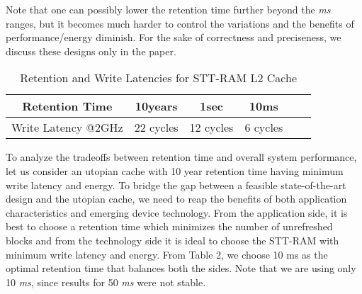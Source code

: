 Note that one can possibly lower the retention time further beyond the {\it ms} ranges, but it becomes much harder to control the variations and the benefits of performance/energy diminish. For the sake of correctness and preciseness,
we discuss these designs only in the paper.


\begin{table*}[t]
  \centering
  \caption{Retention and Write Latencies for STT-RAM L2 Cache}
  \label{table:rt-wt}
  \begin{tabular}{| c | c | c | c | c | c |}
  	\hline
	 Retention Time & 10years & 1sec &10ms \\
	\hline
	Write Latency @2GHz & 22 cycles & 12 cycles & 6 cycles \\
	\hline
  \end{tabular}
\end{table*}

To analyze the tradeoffs between retention time and overall system performance, let us consider an utopian cache
with 10 year retention time having minimum write latency and energy.  To bridge the gap between a
feasible state-of-the-art design and the utopian cache, we need to reap the benefits of both application
characteristics and emerging device technology. From the application side, it is best to choose a retention time
which minimizes the number of unrefreshed blocks and from the technology side it is ideal to choose the
STT-RAM with minimum write latency and energy. From Table 2, we choose 10 ms as the optimal retention time that
balances both the sides. Note that we are using only 10 {\it ms}, since results for 50 {\it ms} were not stable.








